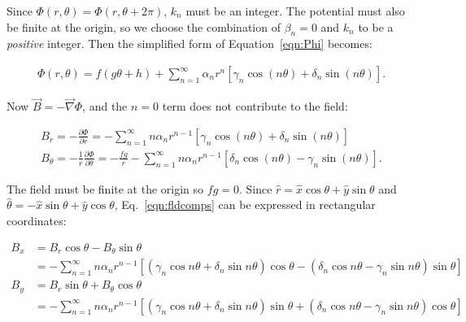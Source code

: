 Since $\Phi(r,\theta) = \Phi(r,\theta+2\pi)$, $k_n$ must be an integer.  The potential must also be finite at the origin, so we choose the combination of $\beta_n=0$ and $k_n$ to be a {\it positive} integer.  Then the simplified form of Equation~\ref{eqn:Phi} becomes:

\begin{center}
\begin{equation}
\begin{array}{c} 
\Phi(r,\theta) = f(g\theta+h)+\sum\limits_{n=1}^\infty \alpha_n r^{n}\left[\gamma_n \cos(n\theta) + \delta_n \sin(n\theta) \right].
\end{array}
\label{eqn:PhiRed}
\end{equation}
\par\end{center} 

Now $\vec{B}=-\vec{\nabla}\Phi$, and the $n=0$ term does not contribute to the field: 

\begin{center}
\begin{subequations}
\begin{align} 
B_r = -\frac{\partial \Phi}{\partial r} = -\sum\limits_{n=1}^\infty n \alpha_n r^{n-1}\left[\gamma_n \cos(n\theta) + \delta_n \sin(n\theta) \right] \\
B_\theta = -\frac{1}{r}\frac{\partial \Phi}{\partial \theta} = -\frac{fg}{r}-\sum\limits_{n=1}^\infty n\alpha_n r^{n-1}\left[\delta_n \cos(n\theta) - \gamma_n \sin(n\theta)\right].
\end{align}
\label{eqn:fldcomps}
\end{subequations}
\par\end{center} 

The field must be finite at the origin so $fg=0$.  Since $\hat{r} = \hat{x} \cos \theta + \hat{y} \sin \theta$ and $\hat{\theta} = -\hat{x} \sin \theta + \hat{y} \cos \theta$, Eq.~\ref{eqn:fldcomps} can be expressed in rectangular coordinates:

\begin{center}
\begin{subequations}
\begin{align} 
B_x &= B_r \cos \theta - B_\theta \sin \theta  \\
&= -\sum\limits_{n=1}^\infty n \alpha_n r^{n-1}\left[\left(\gamma_n \cos n\theta + \delta_n \sin n\theta\right) \cos \theta - \left(\delta_n \cos n\theta  - \gamma_n\sin n\theta\right) \sin \theta \right] \\
B_y &= B_r \sin \theta + B_\theta \cos \theta  \\
&= -\sum\limits_{n=1}^\infty n \alpha_n r^{n-1}\left[\left(\gamma_n \cos n\theta + \delta_n \sin n\theta\right) \sin \theta + \left(\delta_n\cos n\theta - \gamma_n \sin n\theta  \right) \cos \theta \right]
\end{align}
\label{eqn:fldcomps4}
\end{subequations}
\par\end{center} 

